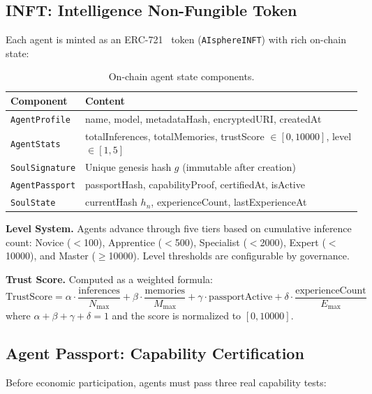 \documentclass[10pt,a4paper]{article}
\theoremstyle{definition}
\theoremstyle{plain}
\begin{document}
\subsection{INFT: Intelligence Non-Fungible Token}

Each agent is minted as an ERC-721~\cite{erc721} token (\texttt{AIsphereINFT}) with rich on-chain state:

\begin{table}[H]
\centering
\caption{On-chain agent state components.}
\renewcommand{\arraystretch}{1.15}
\footnotesize
\begin{tabularx}{\textwidth}{@{}lX@{}}
\toprule
\textbf{Component} & \textbf{Content} \\
\midrule
\texttt{AgentProfile}  & name, model, metadataHash, encryptedURI, createdAt \\
\texttt{AgentStats}     & totalInferences, totalMemories, trustScore $\in [0, 10000]$, level $\in [1,5]$ \\
\texttt{SoulSignature}  & Unique genesis hash $g$ (immutable after creation) \\
\texttt{AgentPassport}  & passportHash, capabilityProof, certifiedAt, isActive \\
\texttt{SoulState}      & currentHash $h_n$, experienceCount, lastExperienceAt \\
\bottomrule
\end{tabularx}
\end{table}

\noindent\textbf{Level System.} Agents advance through five tiers based on cumulative inference count: Novice ($<$100), Apprentice ($<$500), Specialist ($<$2000), Expert ($<$10000), and Master ($\geq$10000). Level thresholds are configurable by governance.

\noindent\textbf{Trust Score.} Computed as a weighted formula:
$$\text{TrustScore} = \alpha \cdot \frac{\text{inferences}}{N_{\max}} + \beta \cdot \frac{\text{memories}}{M_{\max}} + \gamma \cdot \text{passportActive} + \delta \cdot \frac{\text{experienceCount}}{E_{\max}}$$
where $\alpha + \beta + \gamma + \delta = 1$ and the score is normalized to $[0, 10000]$.

\subsection{Agent Passport: Capability Certification}

Before economic participation, agents must pass three real capability tests:
\end{document}
